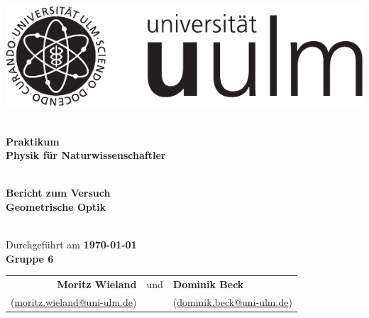 \documentclass[11pt]{betterallrounder}
\begin{document}
\begin{titlepage}

    \begin{center}

        \begin{minipage}{\textwidth}
            \begin{center}
                \includegraphics{Logo_uulm_Vorlage_100mm_schwarz.pdf}
            \end{center}
        \end{minipage}
    
        \textsc{\Large }\\[1.5cm]
        
        {\huge \bfseries Praktikum\\[0.5cm]}
        {\huge \bfseries Physik für Naturwissenschaftler}

        \textsc{\Large }\\[1.5cm]

        {\large \bfseries Bericht zum Versuch}\\[0.5cm]
        
        {\huge \bfseries Geometrische Optik\\[0.4cm]}

        \textsc{\Large }\\[1.5cm]

        {\large Durchgeführt am \bfseries{\today}}\\[1cm]
        
        {\huge \bfseries Gruppe 6\\[0.4cm]}

        \Large
        \begin{tabular}{rcl}
            \bfseries{Moritz Wieland} & und & \bfseries{Dominik Beck}\\
            (\href{mailto:moritz.wieland@uni-ulm.de}{moritz.wieland@uni-ulm.de}) & & (\href{mailto:dominik.beck@uni-ulm.de}{dominik.beck@uni-ulm.de})
        \end{tabular}

        \textsc{\huge }\\[1cm]


\end{center}
\end{titlepage}
\end{document}
